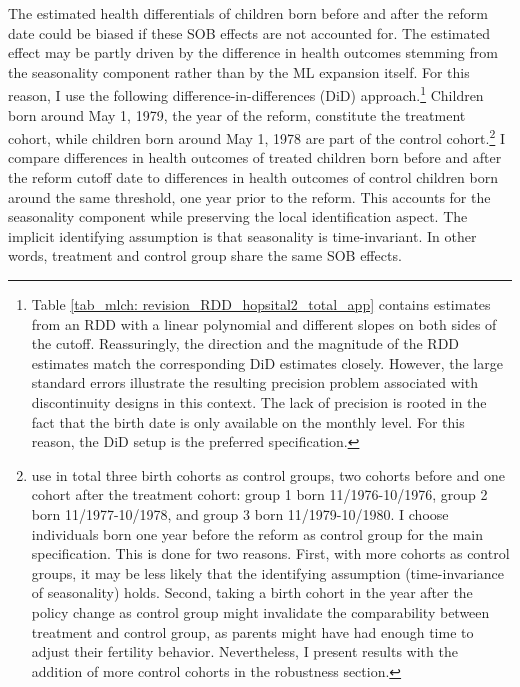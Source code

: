 The estimated health differentials of children born before and after the reform date could be biased if these SOB effects are not accounted for. The estimated effect may be partly driven by the difference in health outcomes stemming from the seasonality component rather than by the ML expansion itself. For this reason, I use the following difference-in-differences (DiD) approach.\footnote{Table \ref{tab_mlch: revision_RDD_hopsital2_total_app} contains estimates from an RDD with a linear polynomial and different slopes on both sides of the cutoff. Reassuringly, the direction and the magnitude of the RDD estimates match the corresponding DiD estimates closely. However, the large standard errors illustrate the resulting precision problem associated with discontinuity designs in this context. The lack of precision is rooted in the fact that the birth date is only available on the monthly level. For this reason, the DiD setup is the preferred specification.} Children born around May 1, 1979, the year of the reform, constitute the treatment cohort, while children born around May 1, 1978 are part of the control cohort.\footnote{\cite{Dustmann2012} use in total three birth cohorts as control groups, two cohorts before and one cohort after the treatment cohort: group 1 born 11/1976-10/1976, group 2 born 11/1977-10/1978, and group 3 born 11/1979-10/1980. I choose individuals born one year before the reform as control group for the main specification. This is done for two reasons. First, with more cohorts as control groups, it may be less likely that the identifying assumption (time-invariance of seasonality) holds. Second, taking a birth cohort in the year after the policy change as control group might invalidate the comparability between treatment and control group, as parents might have had enough time to adjust their fertility behavior. Nevertheless, I present results with the addition of more control cohorts in the robustness section.} I compare differences in health outcomes of treated children born before and after the reform cutoff date to differences in health outcomes of control children born around the same threshold, one year prior to the reform. This accounts for the seasonality component while preserving the local identification aspect. The implicit identifying assumption is that seasonality is time-invariant. In other words, treatment and control group share the same SOB effects.


